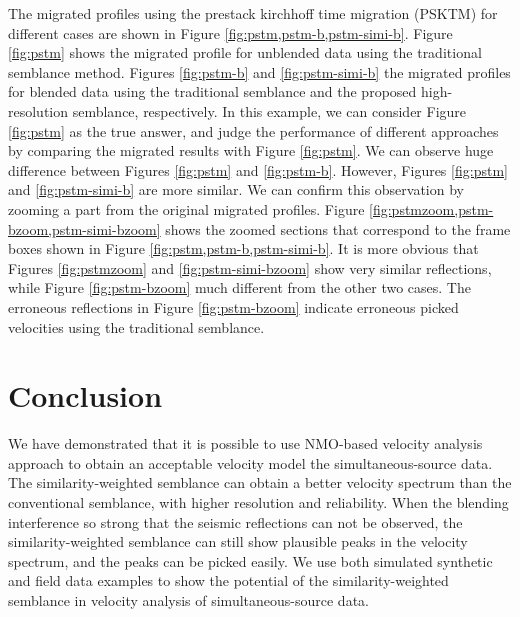 The migrated profiles using the prestack kirchhoff time migration (PSKTM)  for different cases are shown in Figure \ref{fig:pstm,pstm-b,pstm-simi-b}. Figure \ref{fig:pstm} shows the migrated profile for unblended data using the traditional semblance method. Figures \ref{fig:pstm-b} and \ref{fig:pstm-simi-b}  the migrated profiles for blended data using the traditional semblance and the proposed high-resolution semblance, respectively. In this example, we can consider  Figure \ref{fig:pstm} as the true answer, and judge the performance of different approaches by comparing the migrated results with Figure \ref{fig:pstm}. We can observe huge difference between Figures \ref{fig:pstm} and \ref{fig:pstm-b}. However, Figures \ref{fig:pstm} and \ref{fig:pstm-simi-b} are more similar. We can confirm this observation by zooming a part from the original migrated profiles. Figure \ref{fig:pstmzoom,pstm-bzoom,pstm-simi-bzoom} shows the zoomed sections that correspond to the frame boxes shown in Figure \ref{fig:pstm,pstm-b,pstm-simi-b}. It is more obvious that Figures \ref{fig:pstmzoom} and \ref{fig:pstm-simi-bzoom} show very similar reflections, while Figure \ref{fig:pstm-bzoom}  much different from the other two cases. The erroneous reflections in Figure \ref{fig:pstm-bzoom} indicate erroneous picked velocities using the traditional semblance. 

\section{Conclusion}
We have demonstrated that it is possible to use NMO-based velocity analysis approach to obtain an acceptable velocity model  the  simultaneous-source data. The similarity-weighted semblance can obtain a better velocity spectrum than the conventional semblance, with higher resolution and reliability. When the blending interference  so strong that the seismic reflections can not be observed, the similarity-weighted semblance can still show plausible  peaks in the velocity spectrum, and the peaks can  be picked easily.  We use both simulated synthetic and field data examples to show the potential of the similarity-weighted semblance in velocity analysis of simultaneous-source data. 

